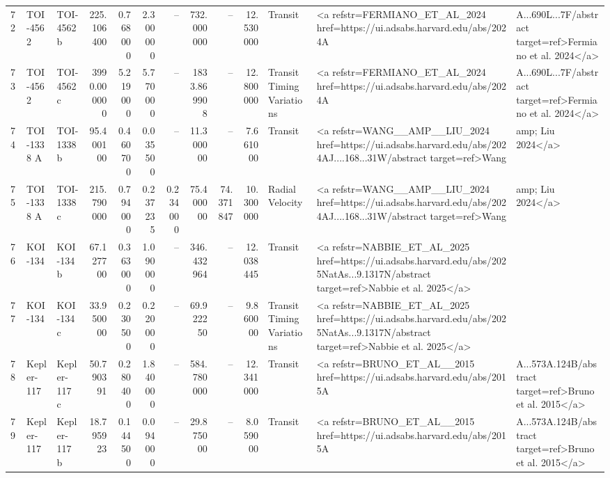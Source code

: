 \begin{tabular}{lllrrrrrrrll}
72 & TOI-4562 & TOI-4562 b & 225.106400 & 0.768000 & 2.300000 & -- & 732.000000 & -- & 12.530000 & Transit & <a refstr=FERMIANO_ET_AL_2024 href=https://ui.adsabs.harvard.edu/abs/2024A&A...690L...7F/abstract target=ref>Fermiano et al. 2024</a> \\
73 & TOI-4562 & TOI-4562 c & 3990.000000 & 5.219000 & 5.770000 & -- & 1833.869908 & -- & 12.800000 & Transit Timing Variations & <a refstr=FERMIANO_ET_AL_2024 href=https://ui.adsabs.harvard.edu/abs/2024A&A...690L...7F/abstract target=ref>Fermiano et al. 2024</a> \\
74 & TOI-1338 A & TOI-1338 b & 95.400100 & 0.460700 & 0.035500 & -- & 11.300000 & -- & 7.661000 & Transit & <a refstr=WANG__AMP__LIU_2024 href=https://ui.adsabs.harvard.edu/abs/2024AJ....168...31W/abstract target=ref>Wang &amp; Liu 2024</a> \\
75 & TOI-1338 A & TOI-1338 c & 215.790000 & 0.794000 & 0.237235 & 0.234000 & 75.400000 & 74.371847 & 10.300000 & Radial Velocity & <a refstr=WANG__AMP__LIU_2024 href=https://ui.adsabs.harvard.edu/abs/2024AJ....168...31W/abstract target=ref>Wang &amp; Liu 2024</a> \\
76 & KOI-134 & KOI-134 b & 67.127700 & 0.363000 & 1.090000 & -- & 346.432964 & -- & 12.038445 & Transit & <a refstr=NABBIE_ET_AL_2025 href=https://ui.adsabs.harvard.edu/abs/2025NatAs...9.1317N/abstract target=ref>Nabbie et al. 2025</a> \\
77 & KOI-134 & KOI-134 c & 33.950000 & 0.230500 & 0.220000 & -- & 69.922250 & -- & 9.860000 & Transit Timing Variations & <a refstr=NABBIE_ET_AL_2025 href=https://ui.adsabs.harvard.edu/abs/2025NatAs...9.1317N/abstract target=ref>Nabbie et al. 2025</a> \\
78 & Kepler-117 & Kepler-117 c & 50.790391 & 0.280400 & 1.840000 & -- & 584.780000 & -- & 12.341000 & Transit & <a refstr=BRUNO_ET_AL__2015 href=https://ui.adsabs.harvard.edu/abs/2015A&A...573A.124B/abstract target=ref>Bruno et al. 2015</a> \\
79 & Kepler-117 & Kepler-117 b & 18.795923 & 0.144500 & 0.094000 & -- & 29.875000 & -- & 8.059000 & Transit & <a refstr=BRUNO_ET_AL__2015 href=https://ui.adsabs.harvard.edu/abs/2015A&A...573A.124B/abstract target=ref>Bruno et al. 2015</a> \\
\bottomrule
\end{tabular}
